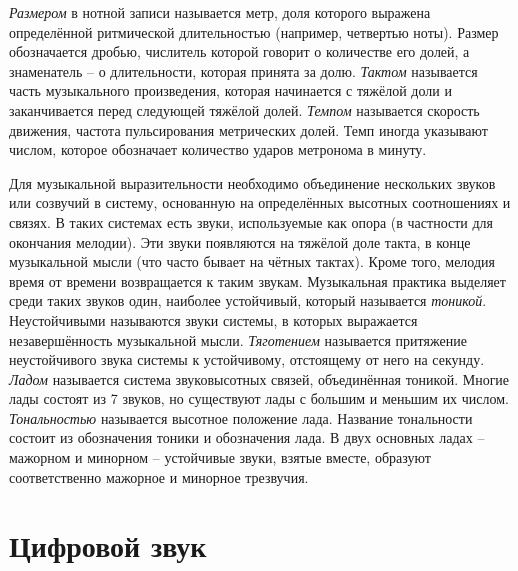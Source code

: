 \emph{Размером} в нотной записи называется метр, доля которого выражена
определённой ритмической длительностью (например, четвертью ноты). Размер
обозначается дробью, числитель которой говорит о количестве его долей, а
знаменатель -- о длительности, которая принята за долю. \emph{Тактом} называется
часть музыкального произведения, которая начинается с тяжёлой доли и
заканчивается перед следующей тяжёлой долей. \emph{Темпом} называется скорость
движения, частота пульсирования метрических долей. Темп иногда указывают числом,
которое обозначает количество ударов метронома в минуту.

Для музыкальной выразительности необходимо объединение нескольких звуков или
созвучий в систему, основанную на определённых высотных соотношениях и связях. В
таких системах есть звуки, используемые как опора (в частности для окончания
мелодии). Эти звуки появляются на тяжёлой доле такта, в конце музыкальной мысли
(что часто бывает на чётных тактах). Кроме того, мелодия время от времени
возвращается к таким звукам. Музыкальная практика выделяет среди таких звуков
один, наиболее устойчивый, который называется \emph{тоникой}. Неустойчивыми
называются звуки системы, в которых выражается незавершённость музыкальной
мысли. \emph{Тяготением} называется притяжение неустойчивого звука системы к
устойчивому, отстоящему от него на секунду. \emph{Ладом} называется система
звуковысотных связей, объединённая тоникой. Многие лады состоят из 7 звуков, но
существуют лады с большим и меньшим их числом. \emph{Тональностью} называется
высотное положение лада. Название тональности состоит из обозначения тоники и
обозначения лада. В двух основных ладах -- мажорном и минорном -- устойчивые
звуки, взятые вместе, образуют соответственно мажорное и минорное трезвучия.

\section{Цифровой звук} \label{sectT_digit}

